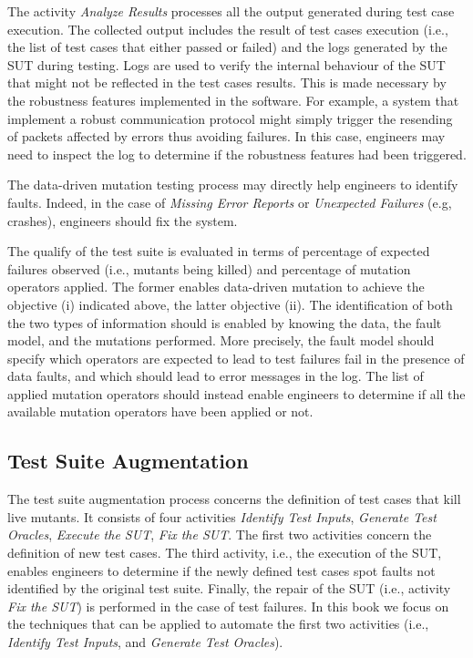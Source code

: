 The activity \emph{Analyze Results} processes all the output generated during test case execution.
The collected output includes the result of test cases execution (i.e., the list of test cases that either passed or failed) and the logs generated by the SUT during testing.
Logs are used to verify  the internal behaviour of the SUT that might not be reflected in the test cases results.
This is made necessary by the robustness features implemented in the software. For example, a system that implement a robust communication protocol might simply trigger the resending of packets affected by errors thus avoiding failures. In this case, engineers may need to inspect the log to determine if the robustness features had been triggered.

The data-driven mutation testing process may directly help engineers to identify faults. Indeed,
in the case of \emph{Missing Error Reports} or \emph{Unexpected Failures }(e.g, crashes), engineers should fix the system.

The qualify of the test suite is evaluated in terms of percentage of expected failures observed (i.e., mutants being killed) and percentage of mutation operators applied. The former enables data-driven mutation to achieve the objective (i) indicated above, the latter objective (ii). 
The identification of both the two types of information should is enabled by knowing the data, the fault model, and the mutations performed. 
More precisely, the fault model should specify which operators are expected to lead to test failures fail in the presence of data faults, and which should lead to error messages in the log. 
The list of applied mutation operators should instead enable engineers to determine if all the available mutation operators have been applied or not.







\subsection{Test Suite Augmentation} %
\label{sec:data:test_suite_augmentation}

The test suite augmentation process concerns the definition of test cases that kill live mutants.
It consists of four activities \emph{Identify Test Inputs}, \emph{Generate Test Oracles}, \emph{Execute the SUT}, \emph{Fix the SUT}. The first two activities concern the definition of new test cases.
The third activity, i.e., the execution of the SUT, enables engineers to determine if the newly defined test cases spot faults not identified by the original test suite. 
Finally, the repair of the SUT (i.e., activity \emph{Fix the SUT}) is performed in the case of test failures.
In this book we focus on the techniques that can be applied to automate the first two activities (i.e., \emph{Identify Test Inputs}, and \emph{Generate Test Oracles}).
 
